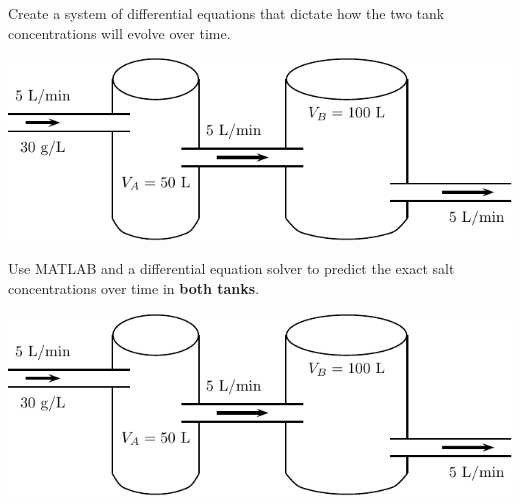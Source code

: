\newpage
\begin{minipage}[h]{0.5\linewidth}
\vspace{0pt}
\begin{problem}
Create a system of differential equations that dictate 
how the two tank concentrations will evolve over time.
\end{problem}
\end{minipage} \hfill
\begin{minipage}[h]{0.45\linewidth}
\vspace{0pt}
\includegraphics[width=1.0\linewidth]{graphics/notes_09_tanks1}
\end{minipage}


\newpage
\begin{minipage}[t]{0.5\linewidth}
\vspace{0pt}
\problem
  Use MATLAB and a differential equation solver to predict the exact salt concentrations over time
in {\bf both tanks}. 
\end{minipage}
\begin{minipage}[t]{0.45\linewidth}
\vspace{0pt}
\includegraphics[width=1.0\linewidth]{graphics/notes_09_tanks1}
\end{minipage}

\newpage

